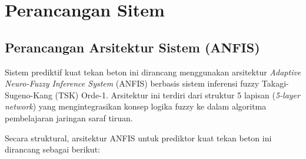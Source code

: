 

\section{Perancangan Sitem}
\subsection{Perancangan Arsitektur Sistem (ANFIS)}
Sistem prediktif kuat tekan beton ini dirancang menggunakan arsitektur \textit{Adaptive Neuro-Fuzzy Inference System} (ANFIS) berbasis sistem inferensi fuzzy Takagi-Sugeno-Kang (TSK) Orde-1. Arsitektur ini terdiri dari struktur 5 lapisan (\textit{5-layer network}) yang mengintegrasikan konsep logika fuzzy ke dalam algoritma pembelajaran jaringan saraf tiruan. 

Secara struktural, arsitektur ANFIS untuk prediktor kuat tekan beton ini dirancang sebagai berikut:

